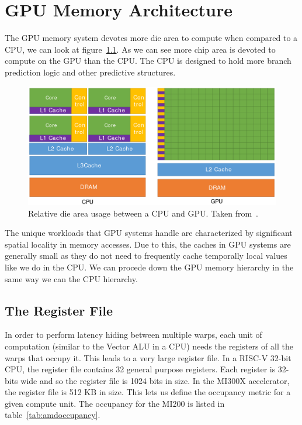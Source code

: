 \chapter{GPU Memory Architecture}

The GPU memory system devotes more die area to compute when compared to a CPU, we can look at figure~\ref{fig:gpudiearea}. As we can see more chip area is devoted to compute on the GPU than the CPU. The CPU is designed to hold more branch prediction logic and other predictive structures.

\begin{figure}
  \centering
  \includegraphics[scale=0.38]{assets/nvidia_die_schema.png}
  \caption{Relative die area usage between a CPU and GPU. Taken from~\cite{nvidia:programming-guide}.}
  \label{fig:gpudiearea}
\end{figure}

The unique workloads that GPU systems handle are characterized by significant spatial locality in memory accesses. Due to this, the caches in GPU systems are generally small as they do not need to frequently cache temporally local values like we do in the CPU. We can procede down the GPU memory hierarchy in the same way we can the CPU hierarchy.

\section{The Register File}

In order to perform latency hiding between multiple warps, each unit of computation (similar to the Vector ALU in a CPU) needs the registers of all the warps that occupy it. This leads to a very large register file. In a RISC-V 32-bit CPU, the register file contains 32 general purpose registers. Each register is 32-bits wide and so the register file is 1024 bits in size. In the MI300X accelerator, the register file is 512 KB in size. This lets us define the occupancy metric for a given compute unit. The occupancy for the MI200 is listed in table~\ref{tab:amdoccupancy}.

